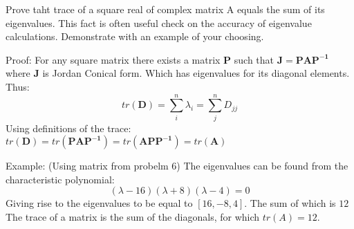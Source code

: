 Prove taht trace of a square real of complex matrix A equals the sum of its eigenvalues. This fact is often useful check on the accuracy of eigenvalue calculations. Demonstrate with an example of your choosing.


Proof:
For any square matrix there exists a matrix $\boldsymbol{P}$ such that $\boldsymbol{J}=\boldsymbol{P}\boldsymbol{A}\boldsymbol{P^{-1}}$ where $\boldsymbol{J}$ is Jordan Conical form. Which has eigenvalues for its diagonal elements. Thus:
\begin{equation*}
tr\left(\boldsymbol{D}\right)=\sum_i^n \lambda_i=\sum_j^n D_{jj}
\end{equation*}
Using definitions of the trace: $tr\left(\boldsymbol{D}\right)=tr\left(\boldsymbol{P}\boldsymbol{A}\boldsymbol{P^{-1}}\right)=tr\left(\boldsymbol{A}\boldsymbol{P}\boldsymbol{P^{-1}}\right)=tr\left(\boldsymbol{A}\right)$

Example: (Using matrix from probelm 6)
The eigenvalues can be found from the characteristic polynomial:
\begin{equation*}
	\left(\lambda-16\right)\left(\lambda+8\right)\left(\lambda-4\right)=0
\end{equation*}
Giving rise to the eigenvalues to be equal to $\left[16, -8, 4\right]$. The sum of which is $12$
The trace of a matrix is the sum of the diagonals, for which $tr\left(A\right)=12$.
